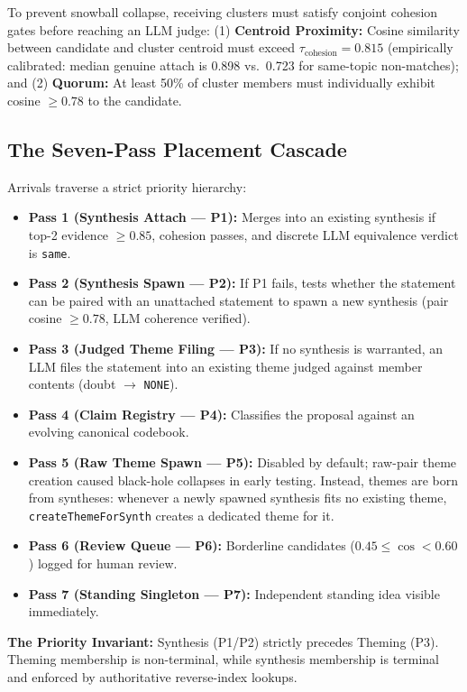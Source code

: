\documentclass{article}
\begin{document}
To prevent snowball collapse, receiving clusters must satisfy conjoint cohesion gates before reaching an LLM judge: (1) \textbf{Centroid Proximity:} Cosine similarity between candidate and cluster centroid must exceed $\tau_{\mathrm{cohesion}} = 0.815$ (empirically calibrated: median genuine attach is 0.898 vs.\ 0.723 for same-topic non-matches); and (2) \textbf{Quorum:} At least 50\% of cluster members must individually exhibit cosine $\geq 0.78$ to the candidate.

\subsection{The Seven-Pass Placement Cascade}

Arrivals traverse a strict priority hierarchy:

\begin{itemize}
\item \textbf{Pass 1 (Synthesis Attach --- P1):} Merges into an existing synthesis if top-2 evidence $\geq 0.85$, cohesion passes, and discrete LLM equivalence verdict is \texttt{same}.
\item \textbf{Pass 2 (Synthesis Spawn --- P2):} If P1 fails, tests whether the statement can be paired with an unattached statement to spawn a new synthesis (pair cosine $\geq 0.78$, LLM coherence verified).
\item \textbf{Pass 3 (Judged Theme Filing --- P3):} If no synthesis is warranted, an LLM files the statement into an existing theme judged against member contents (doubt $\rightarrow$ \texttt{NONE}).
\item \textbf{Pass 4 (Claim Registry --- P4):} Classifies the proposal against an evolving canonical codebook.
\item \textbf{Pass 5 (Raw Theme Spawn --- P5):} Disabled by default; raw-pair theme creation caused black-hole collapses in early testing. Instead, themes are born from syntheses: whenever a newly spawned synthesis fits no existing theme, \texttt{createThemeForSynth} creates a dedicated theme for it.
\item \textbf{Pass 6 (Review Queue --- P6):} Borderline candidates ($0.45 \leq \cos < 0.60$) logged for human review.
\item \textbf{Pass 7 (Standing Singleton --- P7):} Independent standing idea visible immediately.
\end{itemize}

\textbf{The Priority Invariant:} Synthesis (P1/P2) strictly precedes Theming (P3). Theming membership is non-terminal, while synthesis membership is terminal and enforced by authoritative reverse-index lookups.
\end{document}
